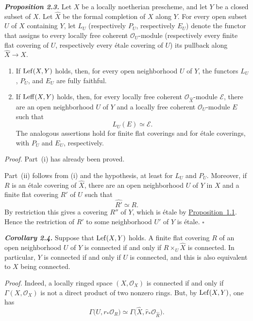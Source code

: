 \medskip
{}\noindent\textbf{\textit{Proposition 2.3.}}
Let $X$ be a locally noetherian prescheme, and let $Y$ be a closed subset of
$X$. Let $\widehat X$ be the formal completion of $X$ along $Y$. For every
open subset $U$ of $X$ containing $Y$, let $L_U$ (respectively $P_U$,
respectively $E_U$) denote the functor that assigns to every locally free
coherent $\mathcal O_U$-module (respectively every finite flat covering of
$U$, respectively every \'{e}tale covering of $U$) its pullback along
$\widehat X\to X$.

\begin{enumerate}[label=(\roman*),leftmargin=2.5em]
\item If $\operatorname{Lef}(X,Y)$ holds, then, for every open neighborhood $U$ of $Y$,
the functors $L_U$, $P_U$, and $E_U$ are fully faithful.

\item If $\operatorname{Leff}(X,Y)$ holds, then, for every locally free coherent
$\mathcal O_{\widehat X}$-module $\mathcal E$, there are an open
neighborhood $U$ of $Y$ and a locally free coherent $\mathcal O_U$-module
$E$ such that
\[
  L_U(E)\simeq\mathcal E.
\]
The analogous assertions hold for finite flat coverings and for \'{e}tale
coverings, with $P_U$ and $E_U$, respectively.
\end{enumerate}

\medskip
\noindent\textit{Proof.}
Part~(i) has already been proved.

Part~(ii) follows from (i) and the hypothesis, at least for $L_U$ and $P_U$.
Moreover, if $R$ is an \'{e}tale covering of $\widehat X$, there are an open
neighborhood $U$ of $Y$ in $X$ and a finite flat covering $R'$ of $U$ such
that
\[
  \widehat{R'}\simeq R.
\]
By restriction this gives a covering $R''$ of $Y$, which is \'{e}tale by
\hyperref[X.1.1]{Proposition~1.1}. Hence the restriction of $R'$ to some neighborhood $U'$ of
$Y$ is \'{e}tale.
\hfill$\square$

\medskip
{}\noindent\textbf{\textit{Corollary 2.4.}}
Suppose that $\operatorname{Lef}(X,Y)$ holds. A finite flat covering $R$ of an open
neighborhood $U$ of $Y$ is connected if and only if
$R\times_U\widehat X$ is connected. In particular, $Y$ is connected if and
only if $U$ is connected, and this is also equivalent to $X$ being
connected.

\medskip
\noindent\textit{Proof.}
Indeed, a locally ringed space $(X,\mathcal O_X)$ is connected if and only if
$\Gamma(X,\mathcal O_X)$ is not a direct product of two nonzero rings. But,
by $\operatorname{Lef}(X,Y)$, one has
\[
  \Gamma\bigl(U,r_*\mathcal O_R\bigr)
  \simeq
  \Gamma\bigl(\widehat X,\widehat r_*\mathcal O_{\widehat R}\bigr).
\]


